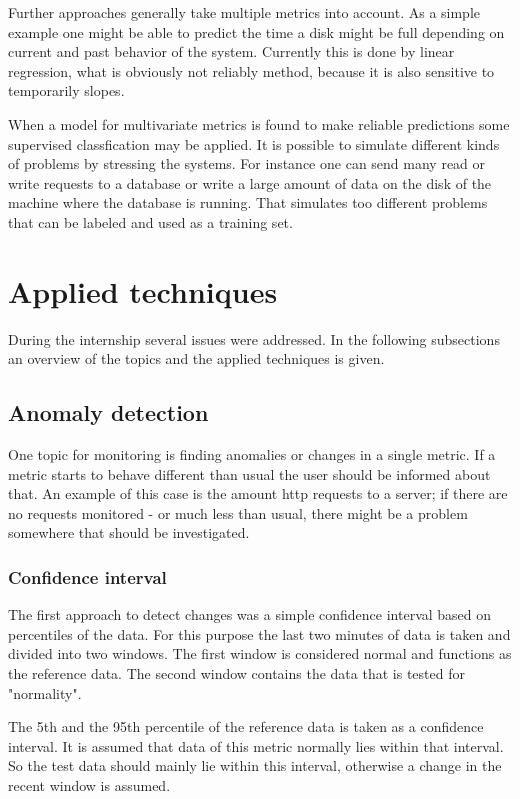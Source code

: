 \documentclass[]{article}
\begin{document}
Further approaches generally take multiple metrics into account.
As a simple example one might be able to predict the time a disk might be full depending on current and past behavior of the system. 
Currently this is done by linear regression, what is obviously not reliably method, because it is also sensitive to temporarily slopes.

When a model for multivariate metrics is found to make reliable predictions some supervised classfication may be applied.
It is possible to simulate different kinds of problems by stressing the systems.
For instance one can send many read or write requests to a database or write a large amount of data on the disk of the machine where the database is running.
That simulates too different problems that can be labeled and used as a training set.

\section{Applied techniques}
During the internship several issues were addressed.
In the following subsections an overview of the topics and the applied techniques is given.

\subsection{Anomaly detection}
One topic for monitoring is finding anomalies or changes in a single metric.
If a metric starts to behave different than usual the user should be informed about that.
An example of this case is the amount http requests to a server; if there are no requests monitored - or much less than usual, there might be a problem somewhere that should be investigated. 

\subsubsection{Confidence interval}
The first approach to detect changes was a simple confidence interval based on percentiles of the data.
For this purpose the last two minutes of data is taken and divided into two windows.
The first window is considered normal and functions as the reference data.
The second window contains the data that is tested for "normality".

The 5th and the 95th percentile of the reference data is taken as a confidence interval.
It is assumed that data of this metric normally lies within that interval.
So the test data should mainly lie within this interval, otherwise a change in the recent window is assumed.
\end{document}
